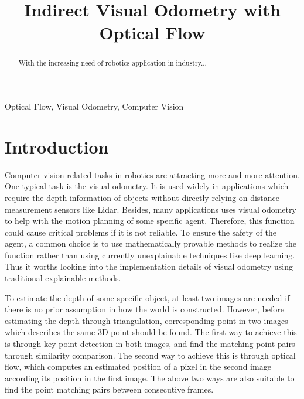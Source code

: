 \documentclass[conference]{IEEEtran}
\begin{document}
\title{Indirect Visual Odometry with Optical Flow}


\author{
}

\maketitle

\begin{abstract}
   With the increasing need of robotics application in industry...
		
\end{abstract}

\begin{IEEEkeywords}
Optical Flow, Visual Odometry, Computer Vision
\end{IEEEkeywords}


\section{Introduction}
Computer vision related tasks in robotics are attracting more and more attention. One typical task is the visual odometry. It is used widely in applications which require the depth information of objects without directly relying on distance measurement sensors like Lidar. Besides, many applications uses visual odometry to help with the motion planning of some specific agent. Therefore, this function could cause critical problems if it is not reliable. To ensure the safety of the agent, a common choice is to use mathematically provable methods to realize the function rather than using currently unexplainable techniques like deep learning. Thus it worths looking into the implementation details of visual odometry using traditional explainable methods.

To estimate the depth of some specific object, at least two images are needed if there is no prior assumption in how the world is constructed. However, before estimating the depth through triangulation, corresponding point in two images which describes the same 3D point should be found. The first way to achieve this is through key point detection in both images, and find the matching point pairs through similarity comparison. The second way to achieve this is through optical flow, which computes an estimated position of a pixel in the second image according its position in the first image. The above two ways are also suitable to find the point matching pairs between consecutive frames. 
\end{document}
